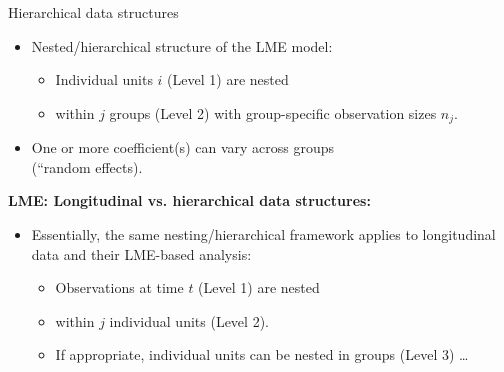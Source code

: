 \documentclass{beamer}
\begin{document}
\begin{frame}{Hierarchical data structures}
\begin{itemize}
\item Nested/hierarchical structure of the LME model:
\medskip
\begin{itemize}
    \item Individual units $i$ (Level 1) are nested
    \medskip
    \item within $j$ groups (Level 2) with group-specific observation sizes $n_j$.
\end{itemize}
\medskip
\item One or more coefficient(s) can vary across groups \\(``random effects).
\end{itemize}
\bigskip
\textbf{LME: Longitudinal vs. hierarchical data structures:}
\medskip
\begin{itemize}
\item Essentially, the same nesting/hierarchical framework applies to longitudinal data and their LME-based analysis:
\medskip
\begin{itemize}
    \item Observations at time $t$ (Level 1) are nested
    \smallskip
    \item within $j$ individual units (Level 2).
    \smallskip
    \item If appropriate, individual units can be nested in groups (Level 3) \dots 
\end{itemize}
\end{itemize}
\end{frame}
\end{document}
